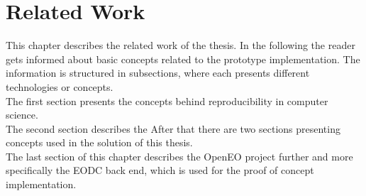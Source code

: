 \documentclass[draft,final]{vutinfth} %
\begin{document}
\chapter{Related Work}\label{Related Work}

This chapter describes the related work of the thesis. In the following the reader gets informed about basic concepts related to the prototype implementation. The information is structured in subsections, where each presents different technologies or concepts. \\The first section presents the concepts behind reproducibility in computer science. \\
The second section describes the 
After that there are two sections presenting concepts used in the solution of this thesis. \\
The last section of this chapter describes the OpenEO project further and more specifically the EODC back end, which is used for the proof of concept implementation.    
\end{document}
